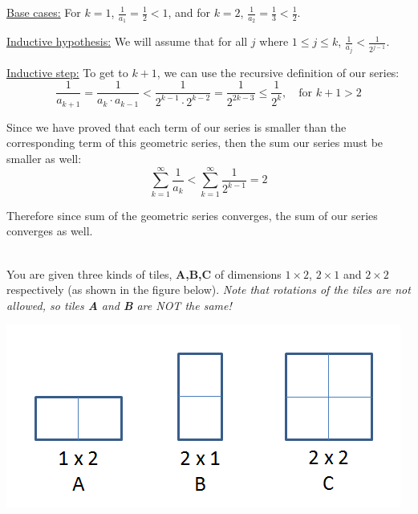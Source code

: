 \documentclass[11pt]{article}
\newif\ifsolutions
\begin{document}
\begin{qunlist}
\underline{Base cases:} For $k=1$, $\frac{1}{a_1} = \frac{1}{2} < 1$, and for $k=2$, $\frac{1}{a_2} = \frac{1}{3} < \frac{1}{2}$.

\underline{Inductive hypothesis:} We will assume that for all $j$ where $1 \leq j \leq k$, $\frac{1}{a_j} < \frac{1}{2^{j-1}}$.

\underline{Inductive step:} To get to $k+1$, we can use the recursive definition of our series:
\[ \frac{1}{a_{k+1}} = \frac{1}{a_k \cdot a_{k-1}} < \frac{1}{2^{k-1} \cdot 2^{k-2}} = \frac{1}{2^{2k-3}} \leq \frac{1}{2^k}, \quad \text{for } k+1 > 2 \]

Since we have proved that each term of our series is smaller than the corresponding term of this geometric series, then the sum our series must be smaller as well:
\[ \sum_{k=1}^{\infty} \frac{1}{a_k} < \sum_{k=1}^{\infty} \frac{1}{2^{k-1}} = 2 \]

Therefore since sum of the geometric series converges, the sum of our series converges as well.
\fi


%
%
%



 \\
You are given three kinds of tiles, \textbf{A,B,C} of dimensions $1 \times 2$, $2 \times 1$
and $2 \times 2$ respectively (as shown in the figure below).
\textit{Note that rotations of the tiles are not allowed, so tiles \textbf{A} and \textbf{B} are NOT the same!}

\begin{minipage}{\linewidth}
\centering
\includegraphics[scale=0.6]{resources/figures/tile.png}
\end{minipage}


\end{qunlist}
\end{document}
